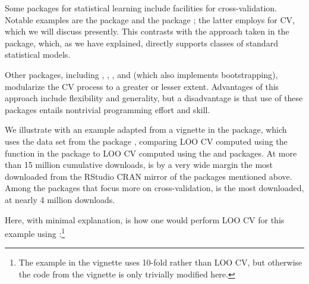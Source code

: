 \documentclass[
]{jss}
\begin{document}
Some  packages for statistical learning include facilities
for cross-validation. Notable examples are the  package
\citep{Kuhn:2008} and the  package \citep{Pfitzinger:2024};
the latter employs  \citep{FrickEtAl:2024} for CV, which we
will discuss presently. This contrasts with the approach taken in the
 package, which, as we have explained, directly supports classes
of standard  statistical models.

Other packages, including  \citep{OlsenZachariae:2024},
 \citep{Kapsner:2024}, 
\citep{CoyleEtAl:2022}, and  (which also implements
bootstrapping), modularize the CV process to a greater or lesser extent.
Advantages of this approach include flexibility and generality, but a
disadvantage is that use of these packages entails nontrivial
programming effort and skill.

We illustrate with an example adapted from a vignette in the
 package, which uses the  data set from the
 package \citep{Kuhn:2024}, comparing LOO CV computed
using the  function in the  package to LOO CV
computed using the  and  packages. At more than
15 million cumulative downloads,  is by a very wide margin
the most downloaded from the RStudio CRAN mirror of the 
packages mentioned above. Among the packages that focus more on
cross-validation,  is the most downloaded, at nearly 4
million downloads.

Here, with minimal explanation, is how one would perform LOO CV for this
example using :\footnote{The example in the 
  vignette uses 10-fold rather than LOO CV, but otherwise the code from
  the vignette is only trivially modified here.}
\end{document}
